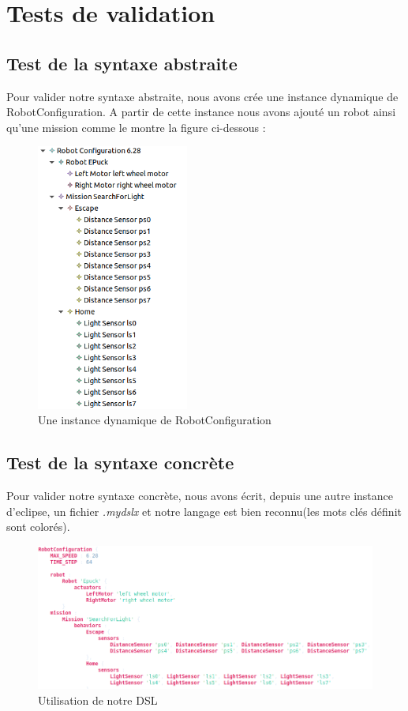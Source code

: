 \documentclass[a4paper,12pt]{article}
\begin{document}
\newpage
\section{Tests de validation}
\subsection{Test de la syntaxe abstraite}
Pour valider notre syntaxe abstraite, nous avons crée une instance dynamique de RobotConfiguration. A partir de cette instance nous avons ajouté un robot ainsi qu'une mission comme le montre la figure ci-dessous :

\begin{figure}[!h]  
    \includegraphics[width=5cm]{instance_xmi.png}
    \caption{Une instance dynamique de RobotConfiguration}
\end{figure}

\subsection{Test de la syntaxe concrète}
Pour valider notre syntaxe concrète, nous avons écrit, depuis une autre instance d'eclipse, un fichier \textit{.mydslx} et notre langage est bien reconnu(les mots clés définit sont colorés).
\begin{figure}[!h]  
    \includegraphics[width=13cm]{xtext.png}
    \caption{Utilisation de notre DSL}
\end{figure}
\end{document}
